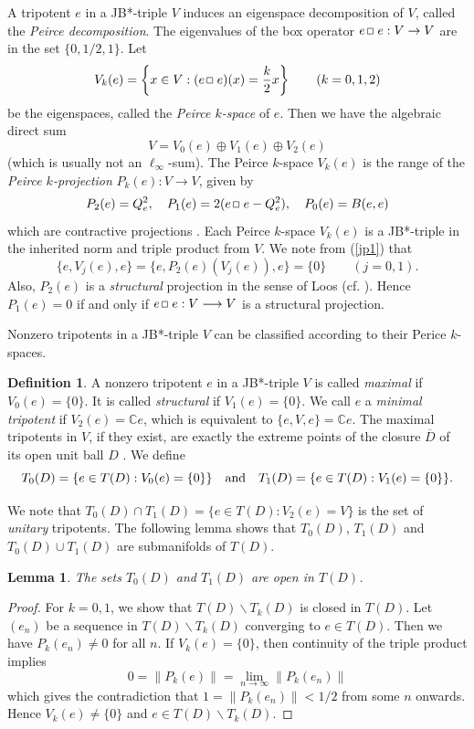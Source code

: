\documentclass[12pt, twoside]{article}
\def\sqr#1#2{{\,\vcenter{\vbox{\hrule height.#2pt\hbox{\vrule width.#2pt
height#1pt \kern#1pt\vrule width.#2pt}\hrule height.#2pt}}\,}}
\def\bo{\sqr44\,}
\newtheorem{lemma}[theorem]{Lemma}
\theoremstyle{definition}
\newtheorem*{xdefn}{Definition}
\numberwithin{equation}{section}
\begin{document}
A tripotent $e$ in a JB*-triple $V$ induces an eigenspace decomposition of $V$, called the
{\it Peirce decomposition}. The eigenvalues of the box operator $e\bo e: V \to V$ are in
the set $\{0, 1/2,1\}$. Let
$$V_k(e) = \left\{x\in V: (e\bo e)(x)=\frac{k}{2} x\right\} \qquad (k=0,1,2)$$
be the eigenspaces, called the {\it Peirce $k$-space} of $e$. Then we have the algebraic direct sum
$$V= V_0(e) \oplus V_1(e) \oplus V_2(e)$$
(which is usually not an $\ell_\infty$-sum). The Peirce $k$-space $V_k(e)$ is the range of
the {\it Peirce $k$-projection} $P_k(e) : V \longrightarrow V$, given by
$$P_2(e) = Q_e^2, \quad P_1(e) = 2(e\bo e -Q_e^2), \quad P_0(e) = B(e,e)$$
which are contractive projections \cite[Proposition 3.2.31]{book2}.
Each Peirce $k$-space $V_k(e)$ is a JB*-triple in the inherited norm and triple product from $V$.
We note from (\ref{jp1}) that
\begin{equation}\label{jp2}
\{e, V_j(e), e\} = \{e, P_2(e)(V_j(e)),e\} = \{0\} \qquad (j=0,1).
\end{equation}
Also, $P_2(e)$ is  a {\it structural} projection
in the sense of Loos (cf. \cite[p. 206]{em}). Hence $P_1(e)=0$ if and only if $e\bo e : V \longrightarrow V$ is
a structural projection.

Nonzero tripotents in a JB*-triple $V$ can be classified according to their Perice $k$-spaces.

\begin{xdefn}
A nonzero tripotent $e$ in a JB*-triple $V$  is called {\it maximal} if $V_0(e)=\{0\}$.
It is called {\it structural} if $V_1(e)=\{0\}$. We call $e$ a {\it minimal tripotent} if $V_2(e)= \mathbb{C}e$,
which is equivalent to $\{e, V,e\}= \mathbb{C}e$.  The maximal tripotents in $V$, if they exist,
are exactly the extreme points of the closure $\overline D$ of its open unit ball $D$ \cite[Theorem 3.2.3]{book}.
We define $$T_0(D)=\{e\in T(D): V_0(e)=\{0\}\} \quad {\rm and} \quad T_1(D)=\{e\in T(D): V_1(e)= \{0\}\}.$$
\end{xdefn}
We note that $T_0(D) \cap T_1(D) = \{e\in T(D): V_2(e)=V\}$ is the set of {\it unitary} tripotents.
The following lemma shows that $T_0(D)$, $T_1(D)$ and $T_0(D) \cup T_1(D)$  are submanifolds of $T(D)$.

\begin{lemma} The sets $T_0(D)$ and $T_1(D)$ are open in $T(D)$.
\end{lemma}
\begin{proof}
For $k=0,1$, we show that $T(D) \backslash T_k(D)$ is closed in $T(D)$.
Let $(e_n)$ be a sequence in $T(D) \backslash T_k(D)$ converging to $e\in T(D)$.
Then we have $P_k(e_n) \neq 0$ for all $n$. If $V_k(e)=\{0\}$, then continuity of the triple product implies
$$0= \|P_k(e)\| = \lim_{n\rightarrow \infty} \|P_k(e_n)\|$$
which gives the contradiction that $1=\|P_k(e_n)\| <1/2$ from some $n$ onwards.
Hence $V_k(e) \neq \{0\}$ and $e \in T(D) \backslash T_k(D)$.
\end{proof}
\end{document}
